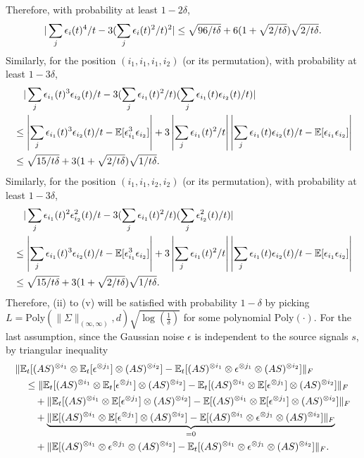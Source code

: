 Therefore, with probability at least $1-2\delta$, 
\[
|\sum_j \epsilon_i(t)^4/t - 3(\sum_j \epsilon_i(t)^2/t)^2| \le \sqrt{96/t\delta}+ 6(1+\sqrt{2/t\delta})\sqrt{2/t\delta}.
\]
Similarly, for the position $(i_1,i_1,i_1,i_2)$ (or its permutation), with probability at least $1-3\delta$,
\begin{align*}
&\quad |\sum_j \epsilon_{i_1}(t)^3\epsilon_{i_2}(t)/t - 3(\sum_j \epsilon_{i_1}(t)^2/t)(\sum_j \epsilon_{i_1}(t)\epsilon_{i_2}(t)/t)| \\
& \le \left|\sum_j \epsilon_{i_1}(t)^3\epsilon_{i_2}(t)/t -  \mathbb{E}[\epsilon_{i_1}^3 \epsilon_{i_2}]\right| +3\left|\sum_j \epsilon_{i_1}(t)^2/t\right|\left|\sum_j \epsilon_{i_1}(t)\epsilon_{i_2}(t)/t - \mathbb{E}[\epsilon_{i_1}\epsilon_{i_2}]\right| \\
& \le \sqrt{15/t\delta}+ 3(1+\sqrt{2/t\delta})\sqrt{1/t\delta}.
\end{align*}
Similarly, for the position $(i_1,i_1,i_2,i_2)$ (or its permutation), with probability at least $1-3\delta$,
\begin{align*}
&\quad |\sum_j \epsilon_{i_1}(t)^2\epsilon_{i_2}^2(t)/t - 3(\sum_j \epsilon_{i_1}(t)^2/t)(\sum_j \epsilon_{i_2}^2(t)/t)| \\
& \le \left|\sum_j \epsilon_{i_1}(t)^3\epsilon_{i_2}(t)/t -  \mathbb{E}[\epsilon_{i_1}^3 \epsilon_{i_2}]\right| +3\left|\sum_j \epsilon_{i_1}(t)^2/t\right|\left|\sum_j \epsilon_{i_1}(t)\epsilon_{i_2}(t)/t - \mathbb{E}[\epsilon_{i_1}\epsilon_{i_2}]\right| \\
& \le \sqrt{15/t\delta}+ 3(1+\sqrt{2/t\delta})\sqrt{1/t\delta}.
\end{align*}
Therefore, (ii) to (v) will be satisfied with probability $1-\delta$ by picking $L = \text{Poly}(\|\Sigma\|_{(\infty,\infty)}, d)\sqrt{\log(\frac{1}{\delta})}$ for some polynomial $\text{Poly}(\cdot)$.
\fi
For the last assumption, since the Gaussian noise $\epsilon$ is independent to the source signals $s$, by triangular inequality 
\begin{align*}
&\|\mathbb{E}_t[(AS)^{\otimes i_1}\otimes \mathbb{E}_t[\epsilon^{\otimes j_1}] \otimes (AS)^{\otimes i_2}] - \mathbb{E}_t[(AS)^{\otimes i_1}\otimes \epsilon^{\otimes j_1}\otimes (AS)^{\otimes i_2}]  \|_F \\
& \quad \le  \|\mathbb{E}_t[(AS)^{\otimes i_1}\otimes \mathbb{E}_t[\epsilon^{\otimes j_1}] \otimes (AS)^{\otimes i_2}] - \mathbb{E}_t[(AS)^{\otimes i_1}\otimes \mathbb{E}[\epsilon^{\otimes j_1}] \otimes (AS)^{\otimes i_2}] \|_F \\
& \quad \quad + \| \mathbb{E}_t[(AS)^{\otimes i_1}\otimes \mathbb{E}[\epsilon^{\otimes j_1}] \otimes (AS)^{\otimes i_2}] - \mathbb{E}[(AS)^{\otimes i_1}\otimes \mathbb{E}[\epsilon^{\otimes j_1}] \otimes (AS)^{\otimes i_2}] \|_F \\
& \quad \quad + \underbrace{\|\mathbb{E}[(AS)^{\otimes i_1}\otimes \mathbb{E}[\epsilon^{\otimes j_1}] \otimes (AS)^{\otimes i_2}]  - \mathbb{E}[(AS)^{\otimes i_1}\otimes \epsilon^{\otimes j_1}\otimes (AS)^{\otimes i_2}] \|_F}_{=0} \\
& \quad \quad + \| \mathbb{E}[(AS)^{\otimes i_1}\otimes \epsilon^{\otimes j_1}\otimes (AS)^{\otimes i_2}] - \mathbb{E}_t[(AS)^{\otimes i_1}\otimes \epsilon^{\otimes j_1}\otimes (AS)^{\otimes i_2}] \|_F.
\end{align*}
